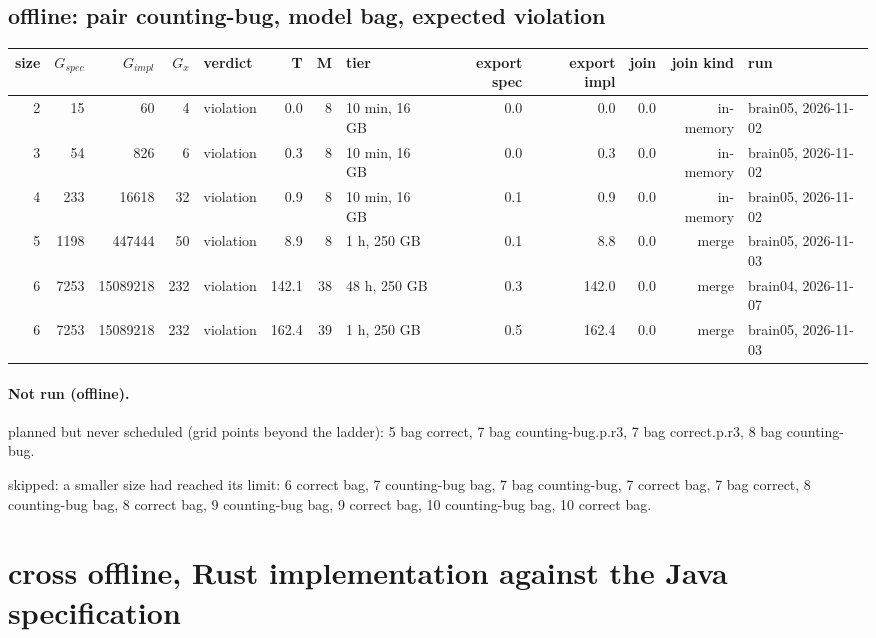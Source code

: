 \documentclass[10pt]{article}
\begin{document}
\subsection*{offline: pair \textsf{counting-bug}, model bag, expected violation}
\begin{longtable}{@{}rrrrlrrlrrrrl@{}}
\toprule
size & $G_{\mathit{spec}}$ & $G_{\mathit{impl}}$ & $G_x$ & verdict & T & M & tier & export spec & export impl & join & join kind & run \\
\midrule
\endhead
\color{red} 2 & 15 & 60 & 4 & violation & 0.0 & 8 & 10 min, 16 GB & 0.0 & 0.0 & 0.0 & in-memory & brain05, 2026-11-02 \\
\color{red} 3 & 54 & 826 & 6 & violation & 0.3 & 8 & 10 min, 16 GB & 0.0 & 0.3 & 0.0 & in-memory & brain05, 2026-11-02 \\
\color{red} 4 & 233 & 16618 & 32 & violation & 0.9 & 8 & 10 min, 16 GB & 0.1 & 0.9 & 0.0 & in-memory & brain05, 2026-11-02 \\
\color{blue} 5 & 1198 & 447444 & 50 & violation & 8.9 & 8 & 1 h, 250 GB & 0.1 & 8.8 & 0.0 & merge & brain05, 2026-11-03 \\
\color{blue} 6 & 7253 & 15089218 & 232 & violation & 142.1 & 38 & 48 h, 250 GB & 0.3 & 142.0 & 0.0 & merge & brain04, 2026-11-07 \\
\color{blue} 6 & 7253 & 15089218 & 232 & violation & 162.4 & 39 & 1 h, 250 GB & 0.5 & 162.4 & 0.0 & merge & brain05, 2026-11-03 \\
\bottomrule
\end{longtable}
\paragraph{Not run (offline).}
planned but never scheduled (grid points beyond the ladder): 5 bag correct, 7 bag counting-bug.p.r3, 7 bag correct.p.r3, 8 bag counting-bug.\par
skipped: a smaller size had reached its limit: 6 correct bag, 7 counting-bug bag, 7 bag counting-bug, 7 correct bag, 7 bag correct, 8 counting-bug bag, 8 correct bag, 9 counting-bug bag, 9 correct bag, 10 counting-bug bag, 10 correct bag.\par
\section*{cross offline, Rust implementation against the Java specification}
\end{document}
